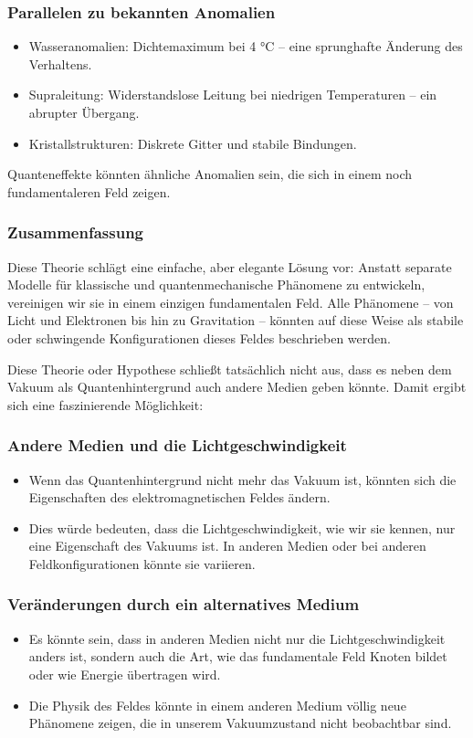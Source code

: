 \documentclass[12pt,a4paper]{article}
\begin{document}
	\subsubsection{Parallelen zu bekannten Anomalien}
	\begin{itemize}
		\item Wasseranomalien: Dichtemaximum bei 4 °C – eine sprunghafte Änderung des Verhaltens.
		\item Supraleitung: Widerstandslose Leitung bei niedrigen Temperaturen – ein abrupter Übergang.
		\item Kristallstrukturen: Diskrete Gitter und stabile Bindungen.
	\end{itemize}
	Quanteneffekte könnten ähnliche Anomalien sein, die sich in einem noch fundamentaleren Feld zeigen.
	
	\subsubsection{Zusammenfassung}
	Diese Theorie schlägt eine einfache, aber elegante Lösung vor: Anstatt separate Modelle für klassische und quantenmechanische Phänomene zu entwickeln, vereinigen wir sie in einem einzigen fundamentalen Feld. Alle Phänomene – von Licht und Elektronen bis hin zu Gravitation – könnten auf diese Weise als stabile oder schwingende Konfigurationen dieses Feldes beschrieben werden.
	
	Diese Theorie oder Hypothese schließt tatsächlich nicht aus, dass es neben dem Vakuum als Quantenhintergrund auch andere Medien geben könnte. Damit ergibt sich eine faszinierende Möglichkeit:
	
	\subsubsection{Andere Medien und die Lichtgeschwindigkeit}
	\begin{itemize}
		\item Wenn das Quantenhintergrund nicht mehr das Vakuum ist, könnten sich die Eigenschaften des elektromagnetischen Feldes ändern.
		\item Dies würde bedeuten, dass die Lichtgeschwindigkeit, wie wir sie kennen, nur eine Eigenschaft des Vakuums ist. In anderen Medien oder bei anderen Feldkonfigurationen könnte sie variieren.
	\end{itemize}
	
	\subsubsection{Veränderungen durch ein alternatives Medium}
	\begin{itemize}
		\item Es könnte sein, dass in anderen Medien nicht nur die Lichtgeschwindigkeit anders ist, sondern auch die Art, wie das fundamentale Feld Knoten bildet oder wie Energie übertragen wird.
		\item Die Physik des Feldes könnte in einem anderen Medium völlig neue Phänomene zeigen, die in unserem Vakuumzustand nicht beobachtbar sind.
	\end{itemize}
	
\end{document}
